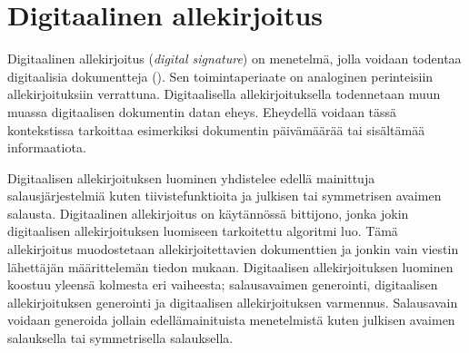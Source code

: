  \section{Digitaalinen allekirjoitus}
 Digitaalinen allekirjoitus (\emph{digital signature}) on menetelmä, jolla voidaan todentaa digitaalisia dokumentteja (\cite{1649003}). Sen toimintaperiaate on analoginen perinteisiin allekirjoituksiin verrattuna. Digitaalisella allekirjoituksella todennetaan muun muassa digitaalisen dokumentin datan eheys. Eheydellä voidaan tässä kontekstissa tarkoittaa esimerkiksi dokumentin päivämäärää tai sisältämää informaatiota.
 
 Digitaalisen allekirjoituksen luominen yhdistelee edellä mainittuja salausjärjestelmiä kuten tiivistefunktioita ja julkisen tai symmetrisen avaimen salausta. Digitaalinen allekirjoitus on käytännössä bittijono, jonka jokin digitaalisen allekirjoituksen luomiseen tarkoitettu algoritmi luo. Tämä allekirjoitus muodostetaan allekirjoitettavien dokumenttien ja jonkin vain viestin lähettäjän määrittelemän tiedon mukaan. Digitaalisen allekirjoituksen luominen koostuu yleensä kolmesta eri vaiheesta; salausavaimen generointi, digitaalisen allekirjoituksen generointi ja digitaalisen allekirjoituksen varmennus. Salausavain voidaan generoida jollain edellämainituista menetelmistä kuten julkisen avaimen salauksella tai symmetrisella salauksella.